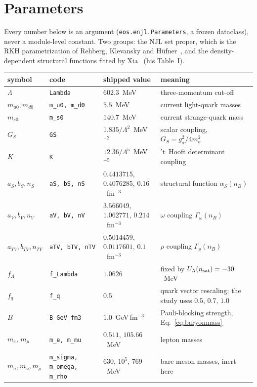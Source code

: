 \documentclass[aps,prc,onecolumn,superscriptaddress,nofootinbib,10pt]{revtex4-2}
\newcommand{\nB}{n_B}
\begin{document}
\section{Parameters}
\label{sec:parameters}

Every number below is an argument (\texttt{eos.enjl.Parameters}, a frozen
dataclass), never a module-level constant. Two groups: the NJL set proper,
which is the RKH parametrization of Rehberg, Klevansky and
H\"ufner~\cite{RehbergKlevanskyHufner1996}, and the density-dependent
structural functions fitted by Xia~\cite{Xia2024} (his Table~I).

\begin{center}
\begin{tabular}{llll}
\toprule
symbol & code & shipped value & meaning \\
\midrule
$\Lambda$   & \texttt{Lambda} & $602.3$~MeV & three-momentum cut-off \\
$m_{u0}, m_{d0}$ & \texttt{m\_u0, m\_d0} & $5.5$~MeV & current light-quark masses \\
$m_{s0}$    & \texttt{m\_s0}  & $140.7$~MeV & current strange-quark mass \\
$G_S$       & \texttt{GS}     & $1.835/\Lambda^2$~MeV$^{-2}$ & scalar coupling,
                                $G_S = g_\sigma^2/4m_\sigma^2$ \\
$K$         & \texttt{K}      & $12.36/\Lambda^5$~MeV$^{-5}$ &
                                't~Hooft determinant coupling~\cite{tHooft1976} \\
\midrule
$a_S, b_S, n_S$ & \texttt{aS, bS, nS} & $0.4413715$, $0.4076285$, $0.16$~fm$^{-3}$
                                & structural function $\alpha_S(\nB)$ \\
$a_V, b_V, n_V$ & \texttt{aV, bV, nV} & $3.566049$, $1.062771$, $0.214$~fm$^{-3}$
                                & $\omega$ coupling $\Gamma_\omega(\nB)$ \\
$a_{TV}, b_{TV}, n_{TV}$ & \texttt{aTV, bTV, nTV}
                                & $0.5014459$, $0.0117601$, $0.1$~fm$^{-3}$
                                & $\rho$ coupling $\Gamma_\rho(\nB)$ \\
\midrule
$f_\Lambda$ & \texttt{f\_Lambda} & $1.0626$ & fixed by $U_\Lambda(n_{\rm sat}) = -30$~MeV \\
$f_q$       & \texttt{f\_q}      & $0.5$ & quark vector rescaling; the study
                                           uses $0.5$, $0.7$, $1.0$ \\
$B$         & \texttt{B\_GeV\_fm3} & $1.0$~GeV\,fm$^{-3}$ & Pauli-blocking
                                           strength, Eq.~\eqref{eq:baryonmass} \\
\midrule
$m_e$, $m_\mu$ & \texttt{m\_e, m\_mu} & $0.511$, $105.66$~MeV & lepton masses \\
$m_\sigma, m_\omega, m_\rho$ & \texttt{m\_sigma, m\_omega, m\_rho}
            & $630$, $10^5$, $769$~MeV & bare meson masses, inert here \\
\bottomrule
\end{tabular}
\end{center}
\end{document}
